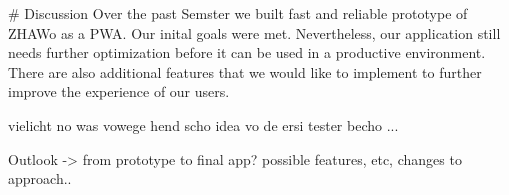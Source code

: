 \begin{markdown}

# Discussion
Over the past Semster we built fast and reliable prototype of ZHAWo as a PWA. Our inital goals were met. Nevertheless, our application still needs further optimization before it can be used in a productive environment. There are also additional features that we would like to implement to further improve the experience of our users.

vielicht no was vowege hend scho idea vo de ersi tester becho ...

Outlook -> from prototype to final app? possible features, etc, changes to approach..

\end{markdown}
